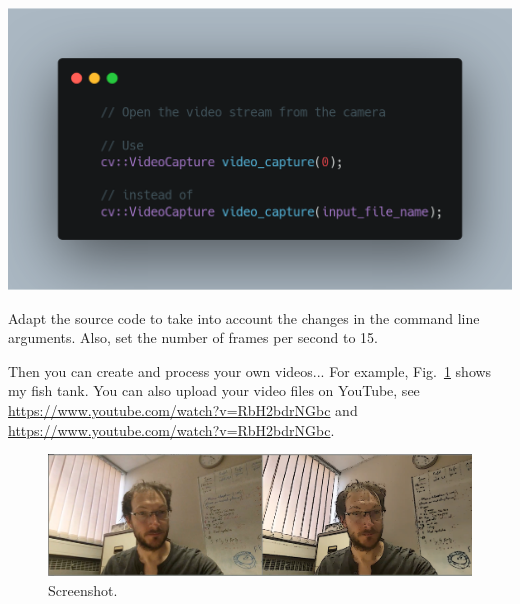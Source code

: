 \documentclass[english,a4paper,12pt,oneside]{article}
\begin{document}
\begin{center}
\includegraphics[width=0.8\linewidth]{carbon(16)}
\end{center}

Adapt the source code to take into account the changes in the command line arguments.
Also, set the number of frames per second to 15. 

Then you can create and process your own videos...
For example, Fig.~\ref{fig:screenshot2} shows my fish tank. You can also upload your video files on YouTube, see \url{https://www.youtube.com/watch?v=RbH2bdrNGbc} and \url{https://www.youtube.com/watch?v=RbH2bdrNGbc}.

 \begin{figure}[htbp]
  \centering
  \includegraphics[width=\linewidth]{screenshot2}
  \caption{\label{fig:screenshot2}Screenshot.}
 \end{figure}



%



\end{document}
